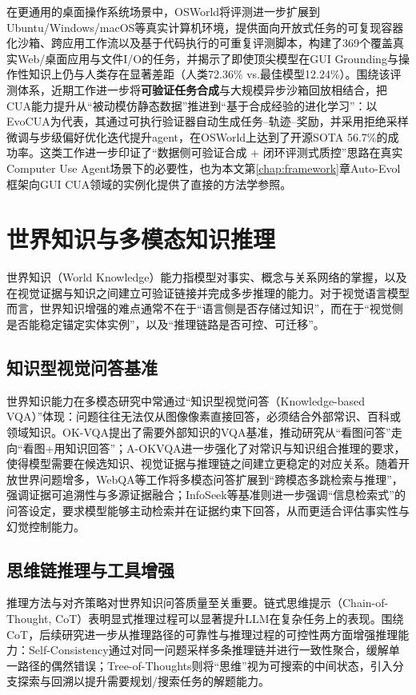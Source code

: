 在更通用的桌面操作系统场景中，OSWorld将评测进一步扩展到Ubuntu/\allowbreak Windows/\allowbreak macOS等真实计算机环境，提供面向开放式任务的可复现容器化沙箱、跨应用工作流以及基于代码执行的可重复评测脚本，构建了369个覆盖真实Web/桌面应用与文件I/O的任务，并揭示了即使顶尖模型在GUI Grounding与操作性知识上仍与人类存在显著差距（人类72.36\% vs.最佳模型12.24\%）\citep{xie2024osworld}。围绕该评测体系，近期工作进一步将\textbf{可验证任务合成}与大规模异步沙箱回放相结合，把CUA能力提升从“被动模仿静态数据”推进到“基于合成经验的进化学习”：以EvoCUA为代表，其通过可执行验证器自动生成任务--轨迹--奖励，并采用拒绝采样微调与步级偏好优化迭代提升agent，在OSWorld上达到了开源SOTA 56.7\%的成功率\citep{xue2026evocua}。这类工作进一步印证了“数据侧可验证合成 + 闭环评测式质控”思路在真实Computer Use Agent场景下的必要性，也为本文第\ref{chap:framework}章Auto-Evol框架向GUI CUA领域的实例化提供了直接的方法学参照。

\section{世界知识与多模态知识推理}
世界知识（World Knowledge）能力指模型对事实、概念与关系网络的掌握，以及在视觉证据与知识之间建立可验证链接并完成多步推理的能力。对于视觉语言模型而言，世界知识增强的难点通常不在于“语言侧是否存储过知识”，而在于“视觉侧是否能稳定锚定实体实例”，以及“推理链路是否可控、可迁移”。

\subsection{知识型视觉问答基准}
世界知识能力在多模态研究中常通过“知识型视觉问答（Knowledge-based VQA）”体现：问题往往无法仅从图像像素直接回答，必须结合外部常识、百科或领域知识。OK-VQA提出了需要外部知识的VQA基准，推动研究从“看图问答”走向“看图+用知识回答”\citep{marino2019okvqa}；A-OKVQA进一步强化了对常识与知识组合推理的要求，使得模型需要在候选知识、视觉证据与推理链之间建立更稳定的对应关系\citep{schwenk2022aokvqa}。随着开放世界问题增多，WebQA等工作将多模态问答扩展到“跨模态多跳检索与推理”，强调证据可追溯性与多源证据融合\citep{chang2022webqa}；InfoSeek等基准则进一步强调“信息检索式”的问答设定，要求模型能够主动检索并在证据约束下回答，从而更适合评估事实性与幻觉控制能力\citep{chen2023infoseek}。

\subsection{思维链推理与工具增强}
推理方法与对齐策略对世界知识问答质量至关重要。链式思维提示（Chain-of-Thought, CoT）表明显式推理过程可以显著提升LLM在复杂任务上的表现\citep{wei2022chain}。围绕CoT，后续研究进一步从推理路径的可靠性与推理过程的可控性两方面增强推理能力：Self-Consistency通过对同一问题采样多条推理链并进行一致性聚合，缓解单一路径的偶然错误\citep{wang2022selfconsistency}；Tree-of-Thoughts则将“思维”视为可搜索的中间状态，引入分支探索与回溯以提升需要规划/搜索任务的解题能力\citep{yao2023tot}。

